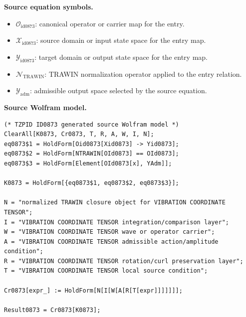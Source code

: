 \begin{minipage}[t]{0.49\linewidth}
\begingroup
\small
\raggedright
\textbf{Source equation symbols.}\par
\begin{itemize}[leftmargin=1.35em,itemsep=1pt,topsep=1pt,parsep=0pt]
    \item $\mathcal{O}_{\mathrm{id0873}}$: canonical operator or carrier map for the entry.
    \item $\mathcal{X}_{\mathrm{id0873}}$: source domain or input state space for the entry map.
    \item $\mathcal{Y}_{\mathrm{id0873}}$: target domain or output state space for the entry map.
    \item $\mathcal{N}_{\mathrm{TRAWIN}}$: TRAWIN normalization operator applied to the entry relation.
    \item $\mathcal{Y}_{\mathrm{adm}}$: admissible output space selected by the source equation.
\end{itemize}
\endgroup
\end{minipage}\hfill
\begin{minipage}[t]{0.47\linewidth}
\begingroup
\scriptsize
\raggedright
\textbf{Source Wolfram model.}\par
\begin{Verbatim}[fontsize=\tiny,breaklines=true,breakanywhere=true]
(* TZPID ID0873 generated source Wolfram model *)
ClearAll[K0873, Cr0873, T, R, A, W, I, N];
eq0873$1 = HoldForm[Oid0873[Xid0873] -> Yid0873];
eq0873$2 = HoldForm[NTRAWIN[OId0873] == OId0873];
eq0873$3 = HoldForm[Element[OId0873[x], YAdm]];

K0873 = HoldForm[{eq0873$1, eq0873$2, eq0873$3}];

N = "normalized TRAWIN closure object for VIBRATION COORDINATE TENSOR";
I = "VIBRATION COORDINATE TENSOR integration/comparison layer";
W = "VIBRATION COORDINATE TENSOR wave or operator carrier";
A = "VIBRATION COORDINATE TENSOR admissible action/amplitude condition";
R = "VIBRATION COORDINATE TENSOR rotation/curl preservation layer";
T = "VIBRATION COORDINATE TENSOR local source condition";

Cr0873[expr_] := HoldForm[N[I[W[A[R[T[expr]]]]]]];

Result0873 = Cr0873[K0873];
\end{Verbatim}
\endgroup
\end{minipage}

